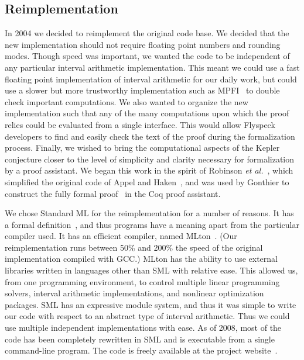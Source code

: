 \documentclass[11pt]{amsart}
\begin{document}

\subsection*{Reimplementation}
\label{sec:sean}

In 2004 we decided to reimplement the original code
base.  We decided that the new implementation should not require 
floating point numbers and rounding modes.  Though speed
was important, we wanted the code to be independent of any particular
interval arithmetic implementation.  This meant we could use a fast
floating point implementation of interval arithmetic for our daily
work, but could use a slower but more trustworthy implementation such
as MPFI~\cite{Revol:2005:MPFI} to double check important computations.
We also wanted to organize the new implementation such that any of the
many computations upon which the proof relies could be evaluated from
a single interface.  This would allow Flyspeck developers to 
find and easily check the text of the proof during the formalization process.
Finally, we wished to bring the computational aspects of the
Kepler conjecture closer to the level of simplicity and clarity
necessary for formalization by a proof assistant.  We began this work
in the spirit of Robinson \textit{et
al.}~\cite{Robertson:1997:JCTB}, which simplified the original code of
Appel and Haken~\cite{Appel:1986:FourColor}, and was used by Gonthier
to construct the fully formal proof~\cite{gonthier:2008:formal} in the
Coq proof assistant.

We chose Standard ML for the reimplementation for a number of reasons.
It has a formal definition~\cite{Milner:1990:SML}, and thus programs
have a meaning apart from the particular compiler used.  It has an
efficient compiler, named MLton~\cite{website:MLton}.  (Our
reimplementation runs between 50\% and 200\% the speed of the original
implementation compiled with GCC.)  MLton has the ability to use
external libraries written in languages other than SML with relative
ease.  This allowed us, from one programming environment, to control multiple linear programming solvers,
interval arithmetic implementations, and nonlinear optimization
packages.
SML has an expressive module system, and thus it was simple to write
our code with respect to an abstract type of interval arithmetic. 
Thus we could use multiple independent implementations
with ease.  As of 2008, most of the code has been completely
rewritten in SML and is executable
from a single command-line program.  The code is freely available
at the project website~\cite{McLaughlin:2008:KeplerCode}.
\end{document}

